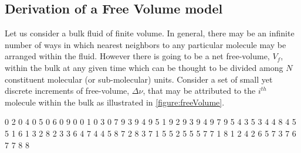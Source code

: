 \subsection{Derivation of a Free Volume model}\label{sec:freeVolumederive}

Let us consider a bulk fluid of finite volume.  In general, there may be an infinite number of ways in which nearest neighbors to any particular molecule may be arranged within the fluid.  However there is going to be a net free-volume, $V_f$, within the bulk at any given time which can be thought to be divided among $N$ constituent molecular (or sub-molecular) units.  Consider a set of small yet discrete increments of free-volume, $\Delta\nu$, that may be attributed to the $i^{th}$ molecule within the bulk as illustrated in \fig \nolinebreak \ref{figure:freeVolume}.  

\def\data{%
	1 0
	2 0
	4 0
	5 0
	6 0
	9 0
	0 1
	0 3
	0 7
	9 3
	9 4
	9 5
	1 9
	2 9
	3 9
	4 9
	7 9
}
\readarray\data\dataFVgrey[4,2] %
\def\data{%
	2 5
}
\readarray\data\dataFVorange[4,2] %
\def\data{%
	1 4
	3 5
	3 4
	4 8
	4 5
	5 1
}
\readarray\data\dataFVred[4,2] %
\def\data{%
	1 6
	1 3
	2 8
	2 3
	3 6
	4 7
	4 4
	5 8
	7 2
	8 3
}
\readarray\data\dataFVblue[4,2] %
\def\data{%
	1 7
	1 5
	5 2
	5 5
	5 7
	7 1
	8 1
}
\readarray\data\dataFVgreen[4,2] %
\def\data{%
	2 2
	4 2
	6 5
	7 3
	7 6
	7 7
	8 8
}
\readarray\data\dataFVviolet[4,2] %


